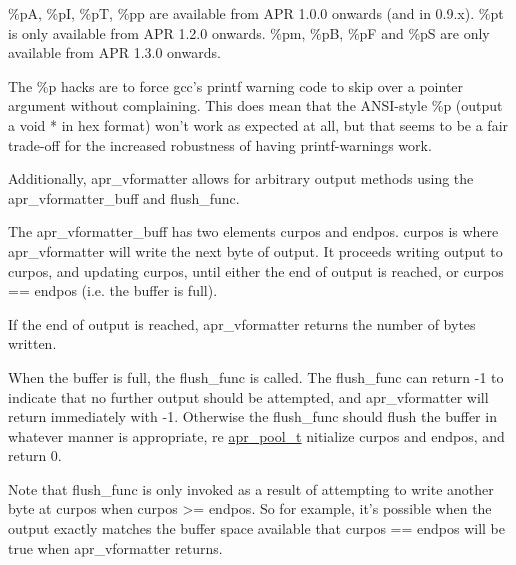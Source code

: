 \begin{DoxyPre}\%pA, \%pI, \%pT, \%pp are available from APR 1.0.0 onwards (and in 0.9.x).
\%pt is only available from APR 1.2.0 onwards.
\%pm, \%pB, \%pF and \%pS are only available from APR 1.3.0 onwards.\end{DoxyPre}



\begin{DoxyPre}The \%p hacks are to force gcc's printf warning code to skip
over a pointer argument without complaining.  This does
mean that the ANSI-style \%p (output a void * in hex format) won't
work as expected at all, but that seems to be a fair trade-off
for the increased robustness of having printf-warnings work.\end{DoxyPre}



\begin{DoxyPre}Additionally, apr\_vformatter allows for arbitrary output methods
using the apr\_vformatter\_buff and flush\_func.\end{DoxyPre}



\begin{DoxyPre}The apr\_vformatter\_buff has two elements curpos and endpos.
curpos is where apr\_vformatter will write the next byte of output.
It proceeds writing output to curpos, and updating curpos, until
either the end of output is reached, or curpos == endpos (i.e. the
buffer is full).\end{DoxyPre}



\begin{DoxyPre}If the end of output is reached, apr\_vformatter returns the
number of bytes written.\end{DoxyPre}



\begin{DoxyPre}When the buffer is full, the flush\_func is called.  The flush\_func
can return -1 to indicate that no further output should be attempted,
and apr\_vformatter will return immediately with -1.  Otherwise
the flush\_func should flush the buffer in whatever manner is
appropriate, re \hyperlink{structapr__pool__t}{apr\_pool\_t} nitialize curpos and endpos, and return 0.\end{DoxyPre}



\begin{DoxyPre}Note that flush\_func is only invoked as a result of attempting to
write another byte at curpos when curpos >= endpos.  So for
example, it's possible when the output exactly matches the buffer
space available that curpos == endpos will be true when
apr\_vformatter returns.\end{DoxyPre}




